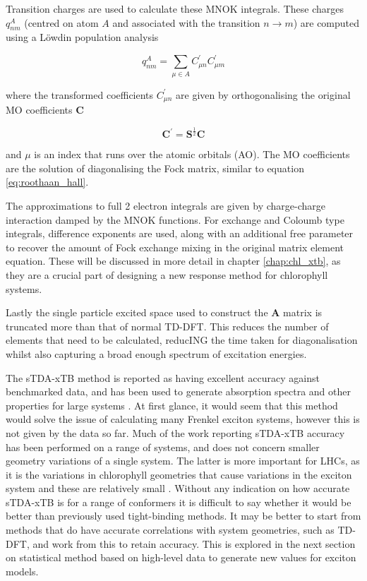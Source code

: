 Transition charges are used to calculate these MNOK integrals. These charges $q^A_{nm}$
(centred on atom $A$ and associated with the transition $ n \rightarrow m$) are
computed using a Löwdin population analysis

\begin{equation}
q_{nm}^A = \sum_{\mu \in A} C^\prime_{\mu n} C^\prime_{\mu m}
\end{equation}

where the transformed coefficients $C^\prime_{\mu n}$ are given by orthogonalising
the original MO coefficients $\textbf{C}$

\begin{equation}
\textbf{C}^\prime = \textbf{S}^{\frac{1}{2}} \textbf{C}
\end{equation}

and $\mu$ is an index that runs over the atomic orbitals (AO). The MO coefficients
are the solution of diagonalising the Fock matrix, similar to equation \ref{eq:roothaan_hall}.

The approximations to full 2 electron integrals are given by charge-charge interaction
damped by the MNOK\cite{Nishimoto1957, Ohno1964, Klopman1964} functions. For exchange
and Coloumb type integrals, difference exponents are used, along with an additional 
free parameter to recover the amount of Fock exchange mixing in the original matrix
element equation. These will be discussed in more detail in chapter \ref{chap:chl_xtb},
as they are a crucial part of designing a new response method for chlorophyll systems.

Lastly the single particle excited space used to construct the $\mathbf{A}$ matrix
is truncated more than that of normal TD-DFT. This reduces the number of elements
that need to be calculated, reducING the time taken for diagonalisation whilst also
capturing a broad enough spectrum of excitation energies. 

The sTDA-xTB method is reported as having excellent accuracy against benchmarked
data, and has been used to generate absorption spectra and other properties for 
large systems \cite{Grimme2016, Seibert2019, Wilbraham2018, Verma2022, HeathApostolopoulos2019}. 
At first glance, it would seem that this method would solve the issue of calculating 
many Frenkel exciton systems, however this is not given by the data so far. Much 
of the work reporting sTDA-xTB accuracy has been performed on a range of systems,
and does not concern smaller geometry variations of a single system. The latter
is more important for LHCs, as it is the variations in chlorophyll geometries that 
cause variations in the exciton system and these are relatively small \cite{Sirohiwal2020}.
Without any indication on how accurate sTDA-xTB is for a range of conformers it 
is difficult to say whether it would be better than previously used tight-binding 
methods. It may be better to start from methods that do have accurate correlations 
with system geometries, such as TD-DFT, and work from this to retain accuracy. This 
is explored in the next section on statistical method based on high-level data to 
generate new values for exciton models.

